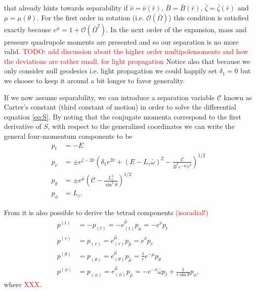 \documentclass[iop, usenatbib]{emulateapj}
\makeatletter
\def\fvec#1{\underline{\sbox\tw@{$#1$}\dp\tw@\z@\box\tw@}}
\newcommand{\red}[1]{\textcolor{red}{#1}}
\newcommand{\pd}{\ensuremath{\partial}} %
\newcommand{\Ca}{\ensuremath{\mathcal{C}}}
\newcommand{\rb}{\ensuremath{\bar{r}}}
\newcommand{\wb}{\ensuremath{\bar{\omega}}}
\newcommand{\Ob}{\ensuremath{\bar{\Omega}}}
\newcommand{\nub}{\ensuremath{\bar{\nu}}}
\newcommand{\zetab}{\ensuremath{\bar{\zeta}}}
\newcommand{\Bb}{\ensuremath{\bar{B}}}
\newcommand{\mub}{\ensuremath{\bar{\mu}}}
\makeatother
\begin{document}
that already hints towards separability if $\nub = \nub(\rb)$, $\Bb = \Bb(\rb)$, $\zetab = \zetab(\rb)$ and $\mu = \mu(\theta)$.
For the first order in rotation (i.e. $\mathcal{O}(\Ob)$) this condition is satisfied exactly because $e^{\mub} = 1 + \mathcal{O}(\Ob^2)$.
In the next order of the expansion, mass and pressure quadrupole moments are presented and so our separation is no more valid.
\red{TODO: add discussion about the higher order multipolemoments and how the deviations are rather small. for light propagation} 
Notice also that because we only consider null geodesics i.e. light propagation we could happily set $\delta_1 = 0$ but we choose to keep it around a bit longer to favor generality.

If we now assume separability, we can introduce a separation variable $\Ca$ known as Carter's constant (third constant of motion) in order to solve the differential equation \eqref{eq:S}.
By noting that the conjugate momenta correspond to the first derivative of $S$, with respect to the generalized coordinates we can write the general four-momentum \fvec{p} components to be
\begin{align}
  p_t       &= -E \\
  p_{\rb}    &= \pm e^{\zetab - 2\nub} \left( \delta_1 e^{2\nub} + (E - L_z \wb)^2 - \frac{\Ca}{\Bb^2 e^{-4\nub} \rb^2} \right)^{1/2}\\
  p_{\theta} &= \pm e^{\mub} \left( \Ca - \frac{L_z^2}{\sin^2\theta} \right)^{1/2}\\
  p_{\phi}   &= L_z.
\end{align}

From \fvec{p} it is also possible to derive the tetrad components \red{(isoradial!)}
\begin{align}
  p^{(t)} &= -p_{(t)} = -e_{(t)}^{\hat{\mu}} p_{\hat{\mu}} = -e^{\nub}p_t \label{eq:tetp_t}\\
  p^{(r)} &= p_{(r)} = e_{(r)}^{\hat{\mu}} p_{\hat{\mu}} = e^{\nub} p_r \label{eq:tetp_r}\\
  p^{(\theta)} &= p_{(\theta)} = e_{(\theta)}^{\hat{\mu}} p_{\hat{\mu}} = \frac{1}{r} e^{-\mu} p_{\theta} \label{eq:tetp_theta}\\
  p^{(\phi)} &= p_{(\phi)} = e_{(\phi)}^{\hat{\mu}} p_{\hat{\mu}} = -e^{-\nub} \wb p_t + \frac{1}{r \sin\theta} p_{\phi} \label{eq:tetp_phi},
\end{align}
where \red{XXX}.
\end{document}
